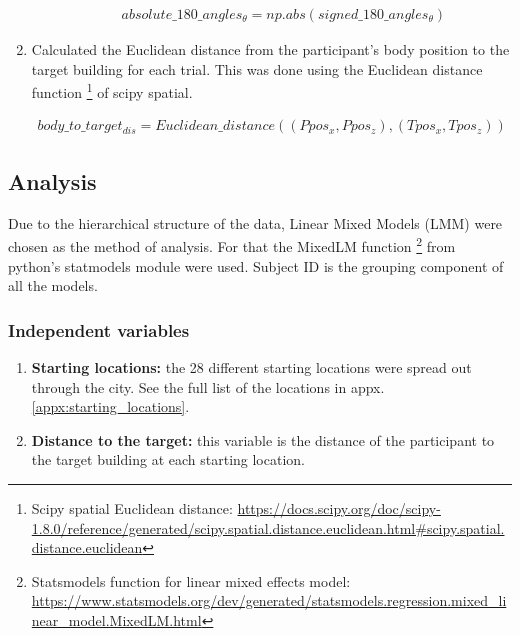 \begin{enumerate}
\begin{enumerate}
		\begin{align*}
			absolute\_180\_angles_{\theta} = np.abs(signed\_180\_angles_{\theta})
		\end{align*}
		
	\end{enumerate}

	\item Calculated the Euclidean distance from the participant's body position to the target building for each trial. This was done using the Euclidean distance function \footnote{Scipy spatial Euclidean distance: \href{https://docs.scipy.org/doc/scipy-1.8.0/reference/generated/scipy.spatial.distance.euclidean.html\#scipy.spatial.distance.euclidean}{https://docs.scipy.org/doc/scipy-1.8.0/reference/generated/scipy.spatial.distance.euclidean.html\#scipy.spatial.distance.euclidean}} of scipy spatial.
	
	\begin{align*}
		body\_to\_target_{dis} = Euclidean\_distance((Ppos_x, Ppos_z), (Tpos_x, Tpos_z))
	\end{align*}

\end{enumerate}



\subsection{Analysis}
Due to the hierarchical structure of the data, Linear Mixed Models (LMM) were chosen as the method of analysis. For that the MixedLM function \footnote{Statsmodels function for linear mixed effects model: \\ \href{https://www.statsmodels.org/dev/generated/statsmodels.regression.mixed\_linear\_model.MixedLM.html}{https://www.statsmodels.org/dev/generated/statsmodels.regression.mixed\_linear\_model.MixedLM.html}} from python's statmodels module were used. Subject ID is the grouping component of all the models.

\subsubsection{Independent variables}

\begin{enumerate}
	\item \textbf{Starting locations:} the 28 different starting locations were spread out through the city. See the full list of the locations in appx. \ref{appx:starting_locations}. \\
	
	\item \textbf{Distance to the target:} this variable is the distance of the participant to the target building at each starting location.
\end{enumerate}

